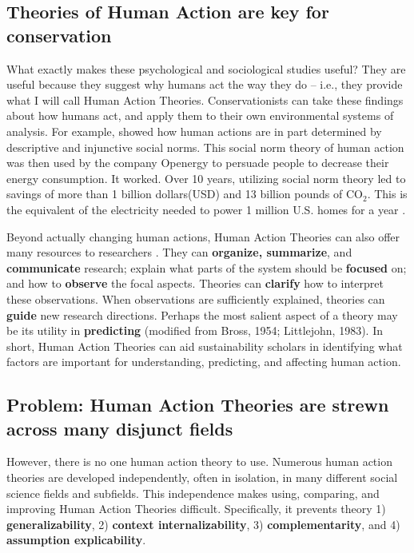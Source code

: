 \documentclass[12 pt]{article}
\begin{document}
\subsection{Theories of Human Action are key for conservation}
What exactly makes these psychological and sociological studies useful? They are useful because they suggest why humans act the way they do -- i.e., they provide what I will call Human Action Theories.  Conservationists can take these findings about how humans act, and apply them to their own environmental systems of analysis. For example,  \textcite{Schultz2007} showed how human actions are in part determined by descriptive and injunctive social norms. This social norm theory of human action was then used by the company Openergy to persuade people to decrease their energy consumption. It worked. Over 10 years, utilizing social norm theory led to savings of more than  1 billion  dollars(USD) and 13 billion pounds of CO$_{\text{2}}$. This is the equivalent of the electricity needed to power 1 million U.S. homes for a year \parencite{Schultz2018}. 

Beyond actually changing human actions, Human Action Theories can also offer many resources to researchers \parencite{Fawcett1978}. They can \textbf{organize, summarize}, and \textbf{communicate} research; explain what parts of the system should be \textbf{focused} on; and how to \textbf{observe} the focal aspects. Theories can \textbf{clarify} how to interpret these observations. When observations are sufficiently explained, theories can \textbf{guide} new research directions.  Perhaps  the most salient aspect of a theory may be its utility in \textbf{predicting} (modified from Bross, 1954; Littlejohn, 1983). In short, Human Action Theories can aid sustainability scholars in identifying what factors are important for understanding, predicting, and affecting human action. 

\subsection{Problem: Human Action Theories are strewn across many disjunct fields}

However, there is no one human action theory to use.  Numerous human action theories are developed independently,  often in isolation, in many different social science fields and subfields. This independence makes using, comparing, and improving Human Action Theories difficult. Specifically, it prevents theory 1) \textbf{generalizability}, 2) \textbf{context internalizability}, 3) \textbf{complementarity}, and 4) \textbf{assumption explicability}.
\end{document}
